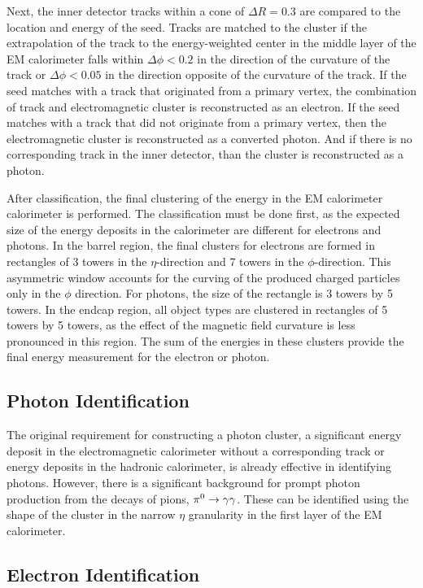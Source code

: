 Next, the inner detector tracks within a cone of $\Delta R = 0.3$ are compared to the location and energy of the seed.
Tracks are matched to the cluster if the extrapolation of the track to the energy-weighted center in the middle layer of the \ac{EM} calorimeter falls within $\Delta\phi < 0.2$ in the direction of the curvature of the track or $\Delta\phi < 0.05$ in the direction opposite of the curvature of the track.
If the seed matches with a track that originated from a primary vertex, the combination of track and electromagnetic cluster is reconstructed as an electron.
If the seed matches with a track that did not originate from a primary vertex, then the electromagnetic cluster is reconstructed as a converted photon.
And if there is no corresponding track in the inner detector, than the cluster is reconstructed as a photon.

After classification, the final clustering of the energy in the \ac{EM} calorimeter calorimeter is performed.
The classification must be done first, as the expected size of the energy deposits in the calorimeter are different for electrons and photons.
In the barrel region, the final clusters for electrons are formed in rectangles of 3 towers in the $\eta$-direction and 7 towers in the $\phi$-direction.
This asymmetric window accounts for the curving of the produced charged particles only in the $\phi$ direction.
For photons, the size of the rectangle is 3 towers by 5 towers.
In the endcap region, all object types are clustered in rectangles of 5 towers by 5 towers, as the effect of the magnetic field curvature is less pronounced in this region.
The sum of the energies in these clusters provide the final energy measurement for the electron or photon.

\subsection{Photon Identification}

The original requirement for constructing a photon cluster, a significant energy deposit in the electromagnetic calorimeter without a corresponding track or energy deposits in the hadronic calorimeter, is already effective in identifying photons.
However, there is a significant background for prompt photon production from the decays of pions, $\pi^0 \rightarrow \gamma\gamma$.
These can be identified using the shape of the cluster in the narrow $\eta$ granularity in the first layer of the \ac{EM} calorimeter.

\subsection{Electron Identification}

